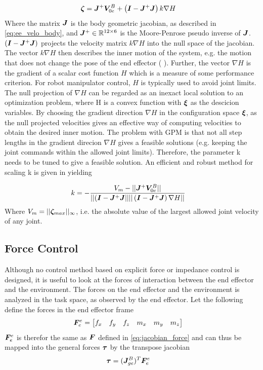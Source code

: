 \begin{align}
	\boldsymbol	\zeta	&= \boldsymbol J^{+}\boldsymbol V_{0e}^B + \left( \boldsymbol I -\boldsymbol J^{+} \boldsymbol J \right)k \nabla H
	\label{eq:gpm1}
\end{align}
Where the matrix $\boldsymbol J$ is the body geometric jacobian, as described in \eqref{eq:ee_velo_body}, and $\boldsymbol J^+ \in \mathbb{R}^{12\times 6}$ is the Moore-Penrose pseudo inverse of $\boldsymbol J$. $\left( \boldsymbol I - \boldsymbol J^{+}\boldsymbol J\right)$ projects the velocity matrix $k \nabla H$ into the null space of the jacobian. The vector $k \nabla H$ then describes the inner motion of the system, e.g. the motion that does not change the pose of the end effector (\cite{Liegeois1977} ).
Further, the vector $\nabla H$ is the gradient of a scalar cost function $H$ which is a measure of some performance criterion. For robot manipulator control, $H$ is typically used to avoid joint limits. The null projection of $\nabla H$
can be regarded as an inexact local solution to an optimization problem, where H is a convex function with $\boldsymbol \xi$ as the descicion variables. By choosing the gradient direction $\nabla H$ in the configuration space $\boldsymbol \xi$, as the null projected velocities gives an effective way of computing velocities to obtain the desired inner motion. The problem with GPM is that not all step lengths in the gradient direcion $\nabla H$ gives a feasible solutions (e.g. keeping the joint commands within the allowed joint limits). Therefore, the parameter k needs to be tuned to give a feasible solution. An efficient and robust method for scaling k is given in \cite{5723588} yielding

\begin{align}
	k&= - \frac{V_{m} - || \boldsymbol J^{+}\boldsymbol V_{0e}^B|| }{||(\boldsymbol I - \boldsymbol J^{+}\boldsymbol J|| ||\left(\boldsymbol I - \boldsymbol J^{+}\boldsymbol J \right) \nabla H||} 
	\label{eq:k-scaling}
\end{align}
Where $V_{m}=||\boldsymbol \zeta_{max}||_{\infty}$, i.e. the absolute value of the largest allowed joint velocity of any joint. 




\subsection{Force Control}

Although no control method based on explicit force or impedance control is designed, it is useful to look at the forces of interaction between the end effector and the environment.
The forces on the end effector and the environment is analyzed in the task space, as observed by the end effector. Let the following define the forces in the end effector frame 
\begin{align}
	\boldsymbol F_{e}^e&=\begin{bmatrix} f_x & f_y & f_z & m_x & m_y & m_z \end{bmatrix}
	\label{eq:force_force}
\end{align}
$\boldsymbol F_{e}^e$ is therefor the same as $\boldsymbol F$ defined in \eqref{eq:jacobian_force} and can thus be mapped into the general forces $\boldsymbol \tau$ by the transpose jacobian
\begin{align}
	\boldsymbol \tau&=(\boldsymbol J_{ge}^{B})^T\boldsymbol F_{e}^e
	\label{eq:jacobian-force2}
\end{align}

